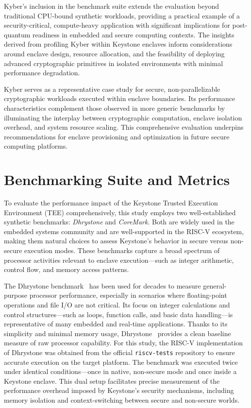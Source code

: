 Kyber’s inclusion in the benchmark suite extends the evaluation beyond traditional CPU-bound synthetic workloads, providing a practical example of a security-critical, compute-heavy application with significant implications for post-quantum readiness in embedded and secure computing contexts. The insights derived from profiling Kyber within Keystone enclaves inform considerations around enclave design, resource allocation, and the feasibility of deploying advanced cryptographic primitives in isolated environments with minimal performance degradation.

Kyber serves as a representative case study for secure, non-parallelizable cryptographic workloads executed within enclave boundaries. Its performance characteristics complement those observed in more generic benchmarks by illuminating the interplay between cryptographic computation, enclave isolation overhead, and system resource scaling. This comprehensive evaluation underpins recommendations for enclave provisioning and optimization in future secure computing platforms.


\section{Benchmarking Suite and Metrics}
\label{sec:benchmarking-tools}

To evaluate the performance impact of the Keystone Trusted Execution Environment (TEE) comprehensively, this study employs two well-established synthetic benchmarks: \textit{Dhrystone} and \textit{CoreMark}. Both are widely used in the embedded systems community and are well-supported in the RISC-V ecosystem, making them natural choices to assess Keystone’s behavior in secure versus non-secure execution modes. These benchmarks capture a broad spectrum of processor activities relevant to enclave execution—such as integer arithmetic, control flow, and memory access patterns.

The Dhrystone benchmark~\cite{weiss2002dhrystone} has been used for decades to measure general-purpose processor performance, especially in scenarios where floating-point operations and file I/O are not critical. Its focus on integer calculations and control structures—such as loops, function calls, and basic data handling—is representative of many embedded and real-time applications. Thanks to its simplicity and minimal memory usage, Dhrystone~\cite{weiss2002dhrystone} provides a clean baseline measure of raw processor capability. For this study, the RISC-V implementation of Dhrystone was obtained from the official \texttt{riscv-tests} repository to ensure accurate execution on the target platform. The benchmark was executed twice under identical conditions—once in native, non-secure mode and once inside a Keystone enclave. This dual setup facilitates precise measurement of the performance overhead imposed by Keystone’s security mechanisms, including memory isolation and context-switching between secure and non-secure worlds.

